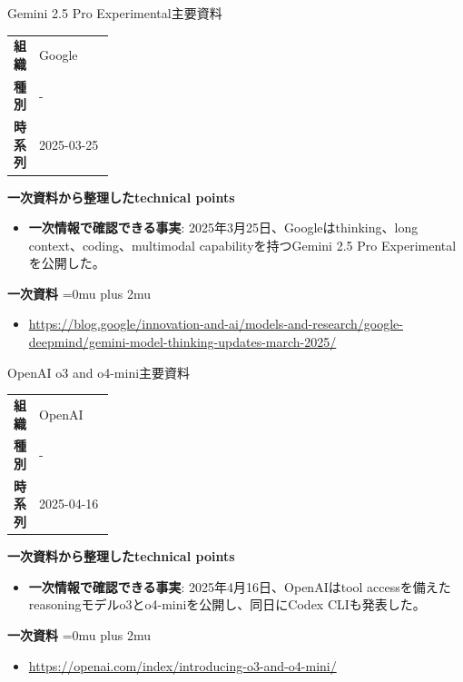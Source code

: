 \begin{technicalnote}{Gemini 2.5 Pro Experimental}{主要資料}
\begingroup
\begin{tabularx}{\linewidth}{@{}>{\bfseries}p{0.22\linewidth}X@{}}
組織 & Google \\
種別 & - \\
時系列 & 2025-03-25 \\
\end{tabularx}
\smallskip
{\bfseries 一次資料から整理したtechnical points}
\begin{itemize}[leftmargin=1.5em,itemsep=0.35em]
\item \textbf{一次情報で確認できる事実}: 2025年3月25日、Googleはthinking、long context、coding、multimodal capabilityを持つGemini 2.5 Pro Experimentalを公開した。
\end{itemize}
\begin{samepage}
{\bfseries 一次資料}
\begingroup\sloppy
\Urlmuskip=0mu plus 2mu\relax
\begin{itemize}[leftmargin=1.5em,itemsep=0.25em]
\item {\scriptsize\url{https://blog.google/innovation-and-ai/models-and-research/google-deepmind/gemini-model-thinking-updates-march-2025/}}
\end{itemize}
\endgroup
\end{samepage}
\endgroup
\end{technicalnote}
\medskip

\begin{technicalnote}{OpenAI o3 and o4-mini}{主要資料}
\begingroup
\begin{tabularx}{\linewidth}{@{}>{\bfseries}p{0.22\linewidth}X@{}}
組織 & OpenAI \\
種別 & - \\
時系列 & 2025-04-16 \\
\end{tabularx}
\smallskip
{\bfseries 一次資料から整理したtechnical points}
\begin{itemize}[leftmargin=1.5em,itemsep=0.35em]
\item \textbf{一次情報で確認できる事実}: 2025年4月16日、OpenAIはtool accessを備えたreasoningモデルo3とo4-miniを公開し、同日にCodex CLIも発表した。
\end{itemize}
\begin{samepage}
{\bfseries 一次資料}
\begingroup\sloppy
\Urlmuskip=0mu plus 2mu\relax
\begin{itemize}[leftmargin=1.5em,itemsep=0.25em]
\item {\scriptsize\url{https://openai.com/index/introducing-o3-and-o4-mini/}}
\end{itemize}
\endgroup
\end{samepage}
\endgroup
\end{technicalnote}
\medskip

